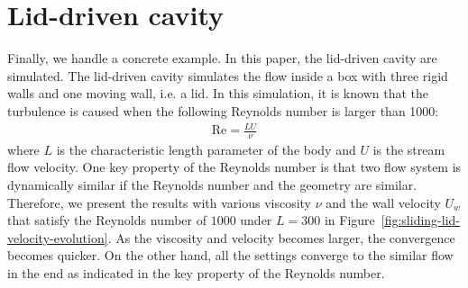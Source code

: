 \section{Lid-driven cavity}
Finally, we handle a concrete example.
In this paper, the lid-driven cavity are simulated.
The lid-driven cavity simulates the flow inside a box with
three rigid walls and one moving wall, i.e. a lid.
In this simulation, it is known that the turbulence is caused 
when the following Reynolds number is larger than 1000:
\begin{equation}
\begin{aligned}
  \text{Re} = \frac{LU}{\nu}
\end{aligned}
\end{equation}
where $L$ is the characteristic length parameter
of the body and $U$ is the stream flow velocity.
One key property of the Reynolds number is that two flow system
is dynamically similar if the Reynolds number and the geometry are similar.
Therefore, we present the results with various 
viscosity $\nu$ and the wall velocity $U_w$ that 
satisfy the Reynolds number of $1000$ under $L = 300$
in Figure~\ref{fig:sliding-lid-velocity-evolution}.
As the viscosity and velocity becomes larger,
the convergence becomes quicker.
On the other hand, all the settings converge to the similar flow in the end
as indicated in the key property of the Reynolds number.

